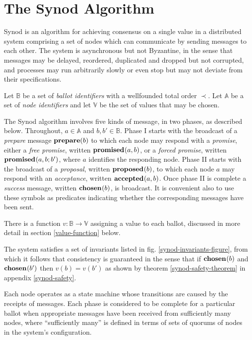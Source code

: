 \documentclass[journal]{IEEEtran}
\begin{document}
\section{The Synod Algorithm}\label{synod-text}

Synod\cite{part-time-parliament} is an algorithm for achieving consensus on a
single value in a distributed system comprising a set of nodes which can
communicate by sending messages to each other. The system is asynchronous but
not Byzantine, in the sense that messages may be delayed, reordered, duplicated
and dropped but not corrupted, and processes may run arbitrarily slowly or even
stop but may not deviate from their specifications.

Let $\mathbb B$ be a set of \textit{ballot identifiers} with a wellfounded
total order $\prec$. Let $\mathbb A$ be a set of \textit{node identifiers} and
let $\mathbb V$ be the set of values that may be chosen.

The Synod algorithm involves five kinds of message, in two phases, as described
below.  Throughout, $a \in \mathbb A$ and $b, b' \in \mathbb B$.  Phase I
starts with the broadcast of a \textit{prepare} message $\mathbf{prepare}(b)$ to which
each node may respond with a \textit{promise}, either a \textit{free promise},
written $\mathbf{promised}_{}(a,b)$, or a \textit{forced promise}, written
$\mathbf{promised}_{}(a,b;b')$, where $a$ identifies the responding node.  Phase II
starts with the broadcast of a \textit{proposal}, written $\mathbf{proposed}_{}(b)$, to
which each node $a$ may respond with an \textit{acceptance}, written
$\mathbf{accepted}_{}(a,b)$. Once phase II is complete a \textit{success} message, written
$\mathbf{chosen}_{}(b)$, is broadcast.  It is convenient also to use these symbols as
predicates indicating whether the corresponding messages have been sent.

There is a function $v : \mathbb B \to \mathbb V$ assigning a value to each
ballot, discussed in more detail in section \ref{value-function} below.

The system satisfies a set of invariants listed in fig.
\ref{synod-invariants-figure}, from which it follows that consistency is
guaranteed in the sense that if $\mathbf{chosen}_{}(b)$ and $\mathbf{chosen}_{}(b')$ then $v(b) =
v(b')$ as shown by theorem \ref{synod-safety-theorem} in appendix
\ref{synod-safety}.

Each node operates as a state machine whose transitions are caused by the
receipts of messages. Each phase is considered to be complete for a particular
ballot when appropriate messages have been received from sufficiently many
nodes, where ``sufficiently many'' is defined in terms of sets of quorums of
nodes in the system's configuration.
\end{document}
